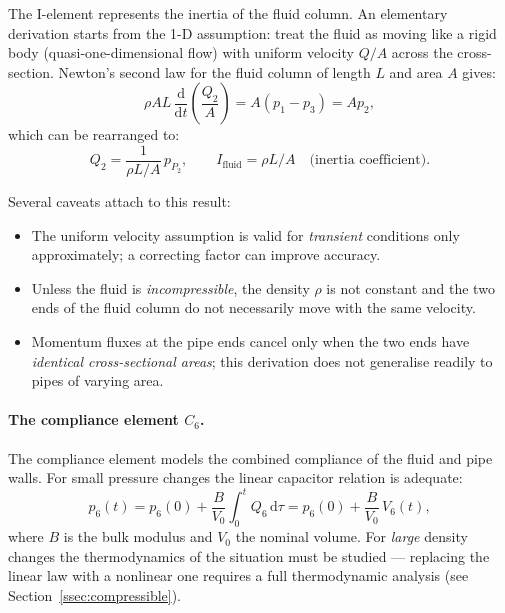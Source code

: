 The I-element represents the inertia of the fluid column.  An elementary
derivation starts from the 1-D assumption: treat the fluid as moving like
a rigid body (quasi-one-dimensional flow) with uniform velocity
$Q/A$ across the cross-section.  Newton's second law for the fluid column of
length $L$ and area $A$ gives:
\begin{equation}
  \rho A L\,\frac{\mathrm{d}}{\mathrm{d}t}\!\left(\frac{Q_{2}}{A}\right)
  = A(p_{1} - p_{3}) = Ap_{2},
  \label{eq:fluid_newton}
\end{equation}
which can be rearranged to:
\begin{equation}
  Q_{2} = \frac{1}{\rho L/A}\,p_{P_{2}},
  \qquad
  I_{\text{fluid}} = \rho L / A
  \quad\text{(inertia coefficient)}.
  \label{eq:fluid_I}
\end{equation}

Several caveats attach to this result:
\begin{itemize}[leftmargin=2em,itemsep=4pt]
  \item The uniform velocity assumption is valid for \emph{transient}
    conditions only approximately; a correcting factor can improve accuracy.
  \item Unless the fluid is \emph{incompressible}, the density $\rho$ is
    not constant and the two ends of the fluid column do not necessarily
    move with the same velocity.
  \item Momentum fluxes at the pipe ends cancel only when the two ends have
    \emph{identical cross-sectional areas}; this derivation does not
    generalise readily to pipes of varying area.
\end{itemize}

\paragraph{The compliance element $C_{6}$.}
The compliance element models the combined compliance of the fluid and pipe
walls.  For small pressure changes the linear capacitor relation is
adequate:
\begin{equation}
  p_{6}(t) = p_{6}(0) + \frac{B}{V_{0}}\int_{0}^{t} Q_{6}\,\mathrm{d}\tau
  = p_{6}(0) + \frac{B}{V_{0}}\,V_{6}(t),
  \label{eq:compliance}
\end{equation}
where $B$ is the bulk modulus and $V_{0}$ the nominal volume.  For
\emph{large} density changes the thermodynamics of the situation must be
studied --- replacing the linear law with a nonlinear one requires a full
thermodynamic analysis (see Section~\ref{ssec:compressible}).


